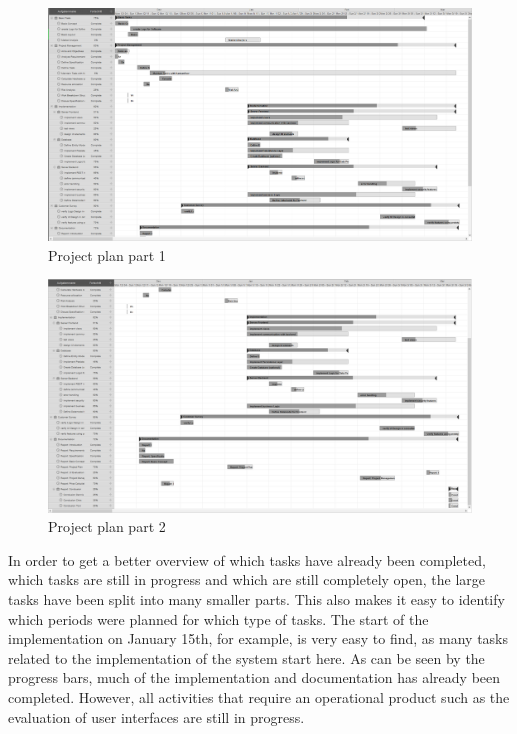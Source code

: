 \begin{landscape}
\thispagestyle{plain}
\begin{figure}[H]
	\centering
	\includegraphics[width =1.4\textwidth]{images/Projectplan1.png}
	\caption{Project plan part 1}
	\label{project-plan1}
\end{figure}
\pagebreak
\thispagestyle{plain}
\begin{figure}[H]
	\centering
	\includegraphics[width =1.4\textwidth]{images/Projectplan2.png}
	\caption{Project plan part 2}
	\label{project-plan2}
\end{figure}
\end{landscape}
In order to get a better overview of which tasks have already been completed, which tasks are still in progress and which are still completely open, the large tasks have been split into many smaller parts. This also makes it easy to identify which periods were planned for which type of tasks. The start of the implementation on January 15th, for example, is very easy to find, as many tasks related to the implementation of the system start here. As can be seen by the progress bars, much of the implementation and documentation has already been completed. However, all activities that require an operational product such as the evaluation of user interfaces are still in progress.
